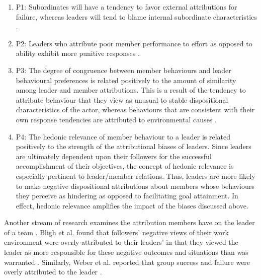 \begin{enumerate}
\item P1:  Subordinates will have a tendency to favor
external attributions for failure, whereas leaders will tend to blame internal subordinate
characteristics \cite{Mitchell1980}.
\item P2: Leaders who attribute poor member performance to effort as opposed to ability exhibit more punitive responses \cite{Mitchell1980}.
\item P3: The degree of congruence between member behaviours and leader behavioural preferences is related positively to the amount of similarity among leader and member attributions. This is a result of the tendency to attribute behaviour that they view as unusual to stable dispositional characteristics of the actor, whereas behaviours that are consistent with their own response tendencies are attributed to environmental causes \cite{Ross1977}.
\item P4: The hedonic relevance of member behaviour to a leader is related positively to the strength of the attributional biases of leaders. Since leaders are ultimately dependent upon their followers for the successful accomplishment of their objectives, the concept of hedonic relevance is especially pertinent to leader/member relations. Thus, leaders are more likely to make negative dispositional attributions about members whose behaviours they perceive as hindering as opposed to facilitating goal attainment. In effect, hedonic relevance amplifies the impact of
the biases discussed above.
\end{enumerate}


Another stream of research examines the attribution members have on the leader of a team \cite{Sweet2020}.  Bligh et al.   found that followers’ negative views of their work environment were overly attributed to their leaders’ in that they viewed the leader as more responsible for these negative outcomes and situations than was warranted \cite{Bligh2007}.  Similarly,  Weber et al.  reported
that group success and failure were overly attributed to the leader \cite{Weber2001}.

